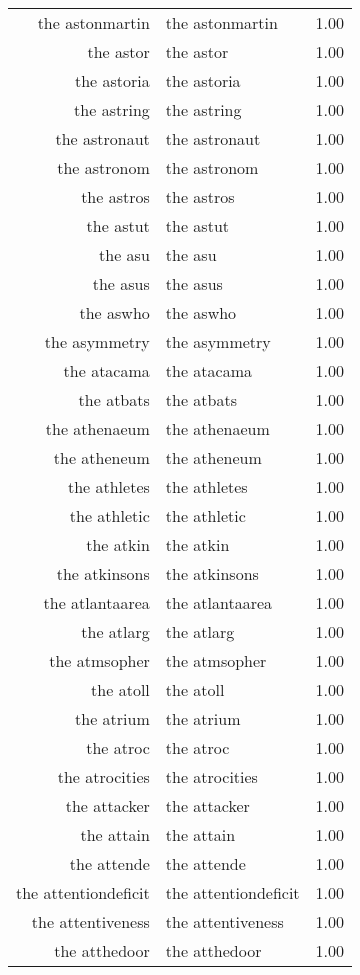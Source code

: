 \begin{table}[ht]
\begin{tabular}{rlr}
  the astonmartin & the astonmartin & 1.00 \\ 
  the astor & the astor & 1.00 \\ 
  the astoria & the astoria & 1.00 \\ 
  the astring & the astring & 1.00 \\ 
  the astronaut & the astronaut & 1.00 \\ 
  the astronom & the astronom & 1.00 \\ 
  the astros & the astros & 1.00 \\ 
  the astut & the astut & 1.00 \\ 
  the asu & the asu & 1.00 \\ 
  the asus & the asus & 1.00 \\ 
  the aswho & the aswho & 1.00 \\ 
  the asymmetry & the asymmetry & 1.00 \\ 
  the atacama & the atacama & 1.00 \\ 
  the atbats & the atbats & 1.00 \\ 
  the athenaeum & the athenaeum & 1.00 \\ 
  the atheneum & the atheneum & 1.00 \\ 
  the athletes & the athletes & 1.00 \\ 
  the athletic & the athletic & 1.00 \\ 
  the atkin & the atkin & 1.00 \\ 
  the atkinsons & the atkinsons & 1.00 \\ 
  the atlantaarea & the atlantaarea & 1.00 \\ 
  the atlarg & the atlarg & 1.00 \\ 
  the atmsopher & the atmsopher & 1.00 \\ 
  the atoll & the atoll & 1.00 \\ 
  the atrium & the atrium & 1.00 \\ 
  the atroc & the atroc & 1.00 \\ 
  the atrocities & the atrocities & 1.00 \\ 
  the attacker & the attacker & 1.00 \\ 
  the attain & the attain & 1.00 \\ 
  the attende & the attende & 1.00 \\ 
  the attentiondeficit & the attentiondeficit & 1.00 \\ 
  the attentiveness & the attentiveness & 1.00 \\ 
  the atthedoor & the atthedoor & 1.00 \\ 

\end{tabular}
\end{table}
